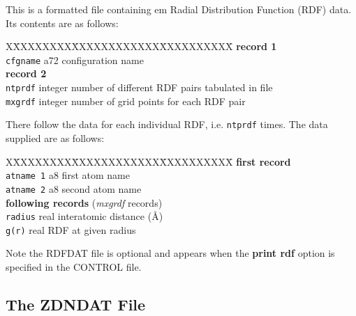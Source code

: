 This is a formatted file containing {em Radial Distribution
Function} (RDF) data.  Its contents are as follows:
\begin{tabbing}
X\=XXXXXXXX\=XXXXXXXXXXXX\=XXXXXXXXXX\=\kill
{\bf record 1} \\
\> {\tt cfgname} \> a72     \> configuration name \\
{\bf record 2} \\
\> {\tt ntprdf}  \> integer \> number of different RDF pairs tabulated in file \\
\> {\tt mxgrdf}  \> integer \> number of grid points for each RDF pair\\
\end{tabbing}
There follow the data for each individual RDF, i.e. {\tt ntprdf}
times.  The data supplied are as follows:
\begin{tabbing}
X\=XXXXXXXX\=XXXXXXXXXXXX\=XXXXXXXXXX\=\kill
{\bf first record} \\
\> {\tt atname 1} \> a8   \> first atom name \\
\> {\tt atname 2} \> a8   \> second atom name \\
{\bf following records} ({\em mxgrdf} records) \\
\> {\tt radius}   \> real \> interatomic distance (\AA) \\
\> {\tt g(r)}     \> real \> RDF at given radius \\
\end{tabbing}
Note the RDFDAT file is optional and appears when the {\bf print
rdf} option is specified in the CONTROL file.

\subsection{The ZDNDAT File}
\label{zdn-file}

